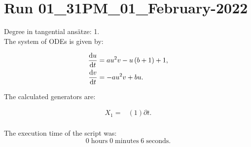 \section*{Run 01\_31PM\_01\_February-2022}
Degree in tangential ansätze:	1.\\
The system of ODEs is given by:

\begin{align*}
\dv{u}{t}&=a u^{2} v - u \left(b + 1\right) + 1,\\
\dv{v}{t}&=- a u^{2} v + b u.\\
\end{align*}

\noindent The calculated generators are:

\begin{align*}
X_{1}=&\left(1 \right)\partial t.\\
\end{align*}

\noindent The execution time of the script was:
$$0\;\mathrm{hours}\;0\;\mathrm{minutes}\;6 \;\mathrm{seconds}.$$
